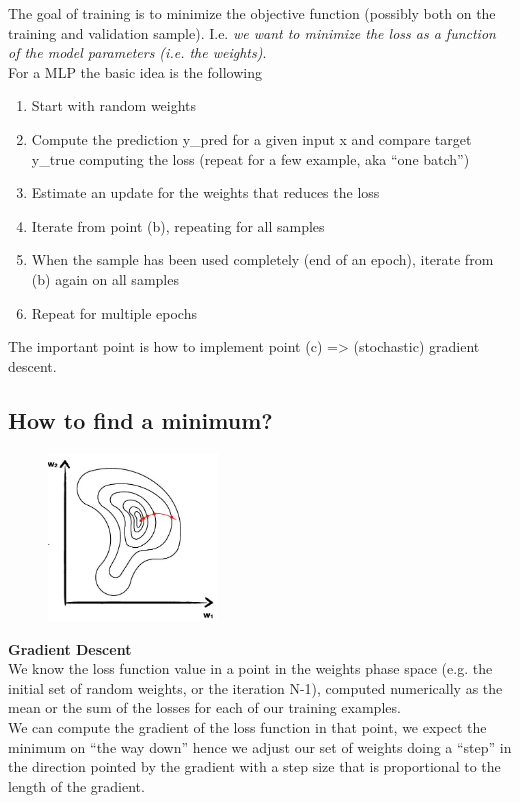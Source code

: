 The goal of training is to minimize the objective
function (possibly both on the training and validation
sample). I.e. \textit{we want to minimize the loss as a function of the model parameters (i.e. the weights)}.\\
For a MLP the basic idea is the following


\begin{enumerate}
	\item Start with random weights
	\item Compute the prediction y\_pred for a given input x and compare target y\_true computing the loss (repeat for a few example, aka “one batch”)
	\item Estimate an update for the weights that reduces the loss
	\item Iterate from point (b), repeating for all samples
	\item When the sample has been used completely (end of an epoch), iterate from (b) again on all samples
	\item Repeat for multiple epochs
\end{enumerate}

The important point is how to implement point (c) => (stochastic) gradient descent.

\subsection{How to find a minimum?}


\begin{figure}
	\includegraphics[width=0.4\textwidth]{figure_ml/find_minimum.png}
\end{figure} 

\textbf{Gradient Descent}\\
We know the loss function value in a point in the weights phase space (e.g. the initial set of random weights, or the iteration
N-1), computed numerically as the mean or the sum of the losses for each of our training examples.\\
We can compute the gradient of the loss function in that point, we expect the minimum on “the way down” hence we adjust our set of weights doing a “step” in the direction pointed by the gradient with a step size that is proportional to the length
of the gradient.\\

